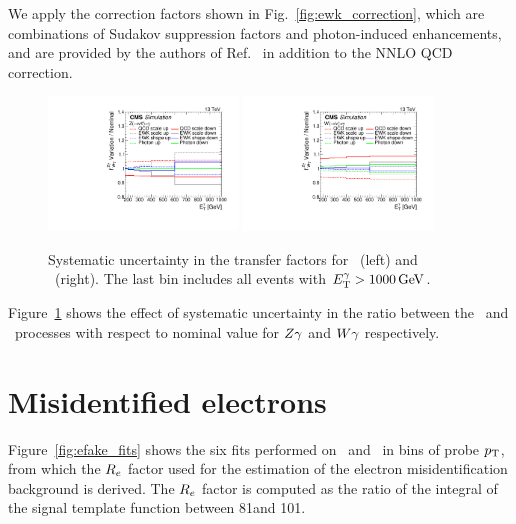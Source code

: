 We apply the correction factors shown in Fig.~\ref{fig:ewk_correction}, which are combinations of Sudakov suppression factors and photon-induced enhancements, and are provided by the authors of Ref.~\cite{Denner:2015fca} in addition to the NNLO QCD correction.

\begin{figure}[htbp]
  \centering
    \includegraphics[width=0.45\textwidth]{Analysis/Figures/tf_syst_zg.pdf}
    \includegraphics[width=0.45\textwidth]{Analysis/Figures/tf_syst_wg.pdf}
    \caption{
      Systematic uncertainty in the transfer factors for \zinvg\ (left) and \wlng\ (right). The last bin includes all events with $E_{\mathrm{T}}^{\gamma} > 1000\,\text{Ge\hspace{-.08em}V}$.
    }
    \label{fig:tf_syst}
\end{figure}

Figure~\ref{fig:tf_syst} shows the effect of systematic uncertainty in the ratio between the \zinvg\ and \wlng\ processes with respect to nominal value for ${{Z}\gamma}$ and ${{W}\gamma}$ respectively.

\section{Misidentified electrons}
\label{sec:efake}

Figure~\ref{fig:efake_fits} shows the six fits performed on \Pe\Pe\ and \Pe\Pgg\ in bins of probe $p_{\mathrm{T}}$, from which the $R_{{e}}$ factor used for the estimation of the electron misidentification background is derived. 
The $R_{{e}}$ factor is computed as the ratio of the integral of the signal template function between 81\GeV and 101\GeV.

